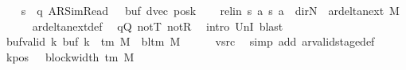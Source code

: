 \begin{isabellebody}
\ \ \isamarkupfalse%
\ {\isacharquery}{\kern0pt}s{\isacharprime}{\kern0pt}\ {\isacharequal}{\kern0pt}\ {\isachardoublequoteopen}{\isacharparenleft}{\kern0pt}q{\isacharcomma}{\kern0pt}\ AR{\isacharunderscore}{\kern0pt}SimRead{\isacharcomma}{\kern0pt}\ {}{\isacharcomma}{\kern0pt}\ {}{\isacharcomma}{\kern0pt}\ buf{\isacharcomma}{\kern0pt}\ dvec{\isacharcomma}{\kern0pt}\ posk{\isacharparenright}{\kern0pt}{\isachardoublequoteclose}\isanewline
\ \ \isamarkupfalse%
\ rel{\isacharunderscore}{\kern0pt}in{\isacharcolon}{\kern0pt}\ {\isachardoublequoteopen}{\isacharparenleft}{\kern0pt}{\isacharquery}{\kern0pt}s{\isacharcomma}{\kern0pt}\ {\isacharquery}{\kern0pt}a{\isacharcomma}{\kern0pt}\ {\isacharquery}{\kern0pt}s{\isacharprime}{\kern0pt}{\isacharcomma}{\kern0pt}\ {\isacharquery}{\kern0pt}a{\isacharcomma}{\kern0pt}\ {\isacharparenleft}{\kern0pt}{\isasymlambda}{\isacharunderscore}{\kern0pt}{\isachardot}{\kern0pt}\ dir{\isachardot}{\kern0pt}N{\isacharparenright}{\kern0pt}{\isacharparenright}{\kern0pt}\ {\isasymin}\ ar{\isacharunderscore}{\kern0pt}delta{\isacharunderscore}{\kern0pt}next\ M{\isachardoublequoteclose}\isanewline
\ \ \ \ \isamarkupfalse%
\ ar{\isacharunderscore}{\kern0pt}delta{\isacharunderscore}{\kern0pt}next{\isacharunderscore}{\kern0pt}def\ \isamarkupfalse%
\ qQ\ notT\ notR\ \isamarkupfalse%
\ {\isacharparenleft}{\kern0pt}intro\ UnI{}{\isacharparenright}{\kern0pt}\ blast\isanewline
\ \ \isamarkupfalse%
\ buf{\isacharunderscore}{\kern0pt}valid{\isacharcolon}{\kern0pt}\ {\isachardoublequoteopen}{\isasymforall}k{\isachardot}{\kern0pt}\ buf\ k\ {\isasymin}\ {\isasymGamma}{\isacharunderscore}{\kern0pt}tm\ M\ {\isasymunion}\ {\isacharbraceleft}{\kern0pt}bl{\isacharunderscore}{\kern0pt}tm\ M{\isacharbraceright}{\kern0pt}{\isachardoublequoteclose}\isanewline
\ \ \ \ \isamarkupfalse%
\ vsrc\ \isamarkupfalse%
\ {\isacharparenleft}{\kern0pt}simp\ add{\isacharcolon}{\kern0pt}\ ar{\isacharunderscore}{\kern0pt}valid{\isacharunderscore}{\kern0pt}stage{\isacharunderscore}{\kern0pt}def{\isacharparenright}{\kern0pt}\isanewline
\ \ \isamarkupfalse%
\ kpos{\isacharcolon}{\kern0pt}\ {\isachardoublequoteopen}{}\ {\isacharless}{\kern0pt}\ block{\isacharunderscore}{\kern0pt}width\ {\isacharparenleft}{\kern0pt}{\isasymGamma}{\isacharunderscore}{\kern0pt}tm\ M{\isacharparenright}{\kern0pt}{\isachardoublequoteclose}\ \isamarkupfalse%

\end{isabellebody}
